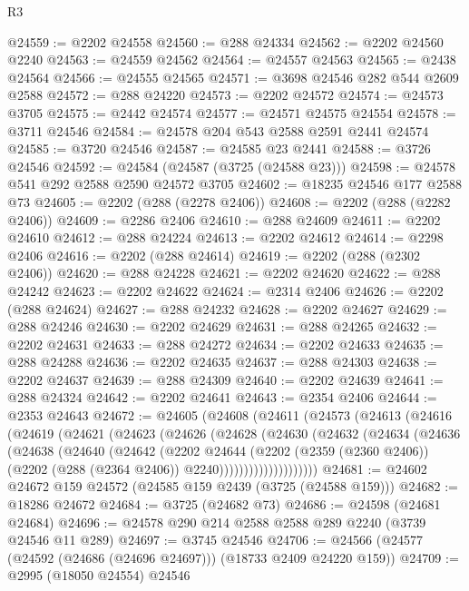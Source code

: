 \begin{lexlean}{R3}
\begin{coremodule}
@24559 := @2202 @24558
@24560 := @288 @24334
@24562 := @2202 @24560 @2240
@24563 := @24559 @24562
@24564 := @24557 @24563
@24565 := @2438 @24564
@24566 := @24555 @24565
@24571 := @3698 @24546 @282 @544 @2609 @2588
@24572 := @288 @24220
@24573 := @2202 @24572
@24574 := @24573 @3705
@24575 := @2442 @24574
@24577 := @24571 @24575 @24554
@24578 := @3711 @24546
@24584 := @24578 @204 @543 @2588 @2591 @2441 @24574
@24585 := @3720 @24546
@24587 := @24585 @23 @2441
@24588 := @3726 @24546
@24592 := @24584 (@24587 (@3725 (@24588 @23)))
@24598 := @24578 @541 @292 @2588 @2590 @24572 @3705
@24602 := @18235 @24546 @177 @2588 @73
@24605 := @2202 (@288 (@2278 @2406))
@24608 := @2202 (@288 (@2282 @2406))
@24609 := @2286 @2406
@24610 := @288 @24609
@24611 := @2202 @24610
@24612 := @288 @24224
@24613 := @2202 @24612
@24614 := @2298 @2406
@24616 := @2202 (@288 @24614)
@24619 := @2202 (@288 (@2302 @2406))
@24620 := @288 @24228
@24621 := @2202 @24620
@24622 := @288 @24242
@24623 := @2202 @24622
@24624 := @2314 @2406
@24626 := @2202 (@288 @24624)
@24627 := @288 @24232
@24628 := @2202 @24627
@24629 := @288 @24246
@24630 := @2202 @24629
@24631 := @288 @24265
@24632 := @2202 @24631
@24633 := @288 @24272
@24634 := @2202 @24633
@24635 := @288 @24288
@24636 := @2202 @24635
@24637 := @288 @24303
@24638 := @2202 @24637
@24639 := @288 @24309
@24640 := @2202 @24639
@24641 := @288 @24324
@24642 := @2202 @24641
@24643 := @2354 @2406
@24644 := @2353 @24643
@24672 := @24605
    (@24608
      (@24611
        (@24573
          (@24613
            (@24616
              (@24619
                (@24621
                  (@24623
                    (@24626
                      (@24628
                        (@24630
                          (@24632
                            (@24634
                              (@24636
                                (@24638
                                  (@24640
                                    (@24642
                                      (@2202
                                        @24644
                                        (@2202
                                          (@2359 (@2360 @2406))
                                          (@2202 (@288 (@2364 @2406)) @2240))))))))))))))))))))
@24681 := @24602 @24672 @159 @24572 (@24585 @159 @2439 (@3725 (@24588 @159)))
@24682 := @18286 @24672
@24684 := @3725 (@24682 @73)
@24686 := @24598 (@24681 @24684)
@24696 := @24578 @290 @214 @2588 @2588 @289 @2240 (@3739 @24546 @11 @289)
@24697 := @3745 @24546
@24706 := @24566 (@24577 (@24592 (@24686 (@24696 @24697))) (@18733 @2409 @24220 @159))
@24709 := @2995 (@18050 @24554) @24546

\end{coremodule}
\end{lexlean}
